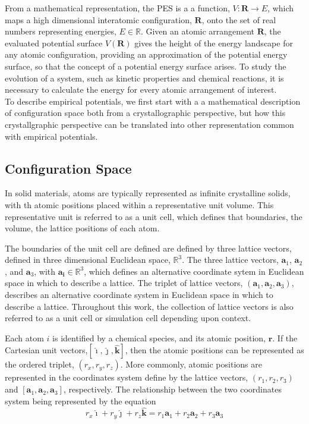 From a mathematical representation, the PES is a a function, ${V:\bm{R}\rightarrow E}$, which maps a high dimensional interatomic configuration, $\bm{R}$, onto the set of real numbers representing energies, $E\in\mathbb{R}$.
Given an atomic arrangement $\bm{R}$, the evaluated potential surface $V(\bm{R})$ gives the height of the energy landscape for any atomic configuration, providing an approximation of the potential energy surface, so that the concept of a potential energy surface arises.
To study the evolution of a system, such as kinetic properties and chemical reactions, it is necessary to calculate the energy for every atomic arrangement of interest.
\\
To describe empirical potentials, we first start with a a mathematical description of configuration space both from a crystallographic perspective, but how this crystallgraphic perspective can be translated into other representation common with empirical potentials.

\subsection{Configuration Space}
In solid materials, atoms are typically represented as infinite crystalline solids, with th atomic positions placed within a representative unit volume.
This representative unit is referred to as a unit cell, which defines that boundaries, the volume, the lattice positions of each atom.

The boundaries of the unit cell are defined are defined by three lattice vectors, defined in three dimensional Euclidean space, $\mathbb{R}^3$.
The three lattice vectors, $\bm{a}_1$, $\bm{a}_2$, and $\bm{a}_3$, with $\bm{a_i}\in\mathbb{R}^3$, which defines an alternative coordinate sytem in Euclidean space in which to describe a lattice.
The triplet of lattice vectors, $(\bm{a}_1,\bm{a}_2,\bm{a}_3)$, describes an alternative coordinate system in Euclidean space in which to describe a lattice.
Throughout this work, the collection of lattice vectors is also referred to as a unit cell or simulation cell depending upon context.

Each atom $i$ is identified by a chemical species, and its atomic position, $\bm{r}$.
If the Cartesian unit vectors,$[\hat{\bm{\imath}},\hat{\bm{\jmath}},\hat{\bm{k}}]$, then the atomic positions can be represented as the ordered triplet, $(r_x,r_y,r_z)$.
More commonly, atomic positions are represented in the coordinates system define by the lattice vectors, $(r_1,r_2,r_3)$ and $[\bm{a}_1,\bm{a}_2,\bm{a}_3]$, respectively.
The relationship between the two coordinates system being represented by the equation
\begin{equation}
	r_x \hat{\bm{\imath}} + r_y \hat{\bm{\jmath}} + r_z \hat{\bm{k}}
	=
	r_1 \bm{a}_1 + r_2 \bm{a}_2 + r_3 \bm{a}_3
\end{equation}

